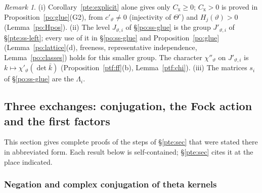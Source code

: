 \documentclass[10pt]{amsart}
\theoremstyle{definition}
\theoremstyle{remark}
\newtheorem{remark}[theorem]{Remark}
\providecommand{\psHS}{\mathcal H}
\providecommand{\psvac}{\mathbf v}
\begin{document}
\begin{remark}\label{pte:rem-final}
(i) Corollary~\ref{pte:explicit} alone gives only $C_{\mathrm x}\ge0$; $C_{\mathrm x}>0$ is proved in Proposition~\ref{po:glue}(G2),
from $c'_\vartheta\ne0$ (injectivity of $\Theta^\circ$) and $H_j(\vartheta)>0$ (Lemma~\ref{po:Hpos}). (ii) The level $J_{\vartheta,i}$ of \S\ref{po:ss-glue} is the group $J'_{\vartheta,i}$ of \S\ref{pte:ss-left}; every use of it
in \S\ref{po:ss-glue} and Proposition~\ref{po:glue} (Lemma~\ref{po:lattice}(d), freeness, representative independence,
Lemma~\ref{po:classes}) holds for this smaller group. The character $\chi''_\vartheta$ on $J'_{\vartheta,i}$ is
$k\mapsto\chi'_\vartheta(\det\bar k)$ (Proposition~\ref{ptf:ff}(b), Lemma~\ref{ptf:chi}). (iii) The
matrices $s_i$ of \S\ref{po:ss-glue} are the $\Lambda_i$.
\end{remark}



\providecommand{\auO}{\mathcal O}
\providecommand{\auU}{\mathrm U}
\providecommand{\auGL}{\mathrm{GL}}
\providecommand{\auHom}{\operatorname{Hom}}
\providecommand{\auA}{\mathbb A}
\providecommand{\auPl}{\Phi}
\providecommand{\aubar}[1]{\overline{#1}}
\providecommand{\pcR}{R}
\providecommand{\pcm}{\mathfrak m}
\providecommand{\pcMat}{\mathrm M}
\providecommand{\psvac}{{\phi^{\mathrm{vac}}}}
\providecommand{\psrho}{\varrho}
\providecommand{\psHS}{\mathcal H}
\providecommand{\psZ}{\mathsf Z}
\providecommand{\poT}{\mathbb T}
\providecommand{\poA}{\mathcal A}
\providecommand{\pop}{\mathsf p}
\providecommand{\pog}{\mathsf g}
\providecommand{\plone}{\mathbf 1}
\providecommand{\pteSD}{\mathrm{SD}}
\providecommand{\pteMP}{\mathrm{MP}}
\providecommand{\pteCS}{\mathop{\textstyle\sum^{\mathrm{cl}}}}

\subsection{Three exchanges: conjugation, the Fock action and the first factors}\label{ptf:sec}

This section gives complete proofs of the steps of \S\ref{pte:sec} that were stated there in
abbreviated form. Each result below is self-contained; \S\ref{pte:sec} cites it at the place
indicated.

\subsubsection{Negation and complex conjugation of theta kernels}\label{ptf:ss-conj}
\end{document}
